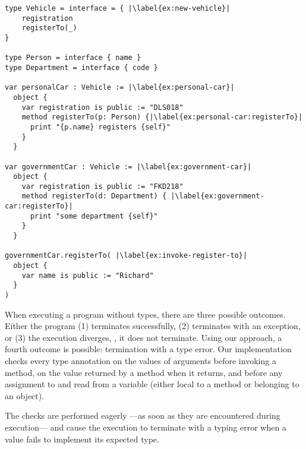 \begin{lstlisting}[caption={A program in development with a well-typed execution.},escapechar=|,label={ex:complex},float,floatplacement=htb,columns=flexible]
type Vehicle = interface = { |\label{ex:new-vehicle}|
    registration
    registerTo(_)
}

type Person = interface { name }
type Department = interface { code }

var personalCar : Vehicle := |\label{ex:personal-car}|
  object {
    var registration is public := "DLS018"
    method registerTo(p: Person) {|\label{ex:personal-car:registerTo}|
      print "{p.name} registers {self}"
    } 
  }

var governmentCar : Vehicle := |\label{ex:government-car}|
  object {
    var registration is public := "FKD218"
    method registerTo(d: Department) { |\label{ex:government-car:registerTo}|
      print "some department {self}"
    }
  }

governmentCar.registerTo( |\label{ex:invoke-register-to}|
  object {
    var name is public := "Richard"
  }
)
\end{lstlisting}


\label{sec:term-type-error}

When executing a program without types, there are three possible outcomes.
Either the program (1) terminates successfully,
(2) terminates with an exception, or 
(3) the execution diverges, \ie, it does not terminate.
Using our approach, a
fourth outcome is possible: termination with a type error.
Our implementation checks  every type annotation
on the values of arguments before invoking a method, 
on the value returned by a method when it returns, and
before any assignment to and read from a variable 
(either local to a method or belonging to an object). 

The checks are performed eagerly%
---as soon as they are encountered during execution---%
and cause the execution to terminate with a typing error 
when a value fails to implement its expected type.

